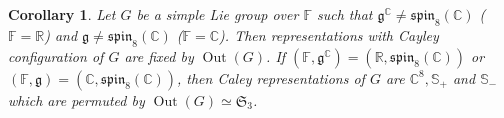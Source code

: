 \documentclass[11pt,reqno]{amsart}
\DeclareMathOperator{\Out}{Out}
\newtheorem{corollary}[theorem]{Corollary}
\begin{document}
\begin{corollary}
Let $G$ be a simple Lie group over $\mathbb{F}$ such that $\mathfrak{g}^{\mathbb{C}} \ne \mathfrak{spin}_8(\mathbb{C})$ ($\mathbb{F} = \mathbb{R}$) and $\mathfrak{g} \ne \mathfrak{spin}_8(\mathbb{C})$ ($\mathbb{F} = \mathbb{C}$).  Then representations with Cayley configuration of $G$ are fixed by $\Out(G)$.  If $(\mathbb{F},  \mathfrak{g}^{\mathbb{C}}) = (\mathbb{R},  \mathfrak{spin}_8(\mathbb{C}))$ or $(\mathbb{F},  \mathfrak{g}) = (\mathbb{C},  \mathfrak{spin}_8(\mathbb{C}))$,  then Caley representations of $G$ are $\mathbb{C}^8,  \mathbb{S}_{+}$ and $\mathbb{S}_{-}$ which are permuted by $\Out(G) \simeq \mathfrak{S}_3$.  
\end{corollary}








 
\end{document}
